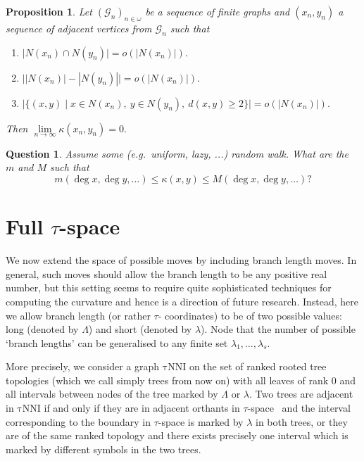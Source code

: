 \documentclass{amsart}
\newtheorem{question}{Question}
\newtheorem{proposition}{Proposition}
\newcommand{\tN}{\mathrm{\tau NNI}}
\begin{document}
\begin{proposition}
Let $(\mathcal G_n)_{n \in \omega}$ be a sequence of finite graphs and 
$(x_n, y_n)$ a sequence of adjacent vertices from $\mathcal G_n$ such that
\begin{enumerate}[(1)]
\item $\big|N(x_n) \cap N(y_n)\big| = o(|N(x_n)|).$ 
\item $\big||N(x_n)| - |N(y_n)|\big| = o(|N(x_n)|).$ 
\item $\big|\{(x,y) \mid x \in N(x_n),~ y \in N(y_n),~ d(x, y) \geq 2\}\big| = o(|N(x_n)|).$
\end{enumerate}

Then $\lim\limits_{n \to \infty} \kappa(x_n, y_n) = 0.$
\end{proposition}

\proof

\endproof

\begin{question}
Assume some (e.g.\ uniform, lazy, ...) random walk. What are the $m$ and $M$ 
such that 
\[
m(\deg x,\deg y, \ldots) \leq \kappa(x,y) \leq M(\deg x, \deg y, \ldots)? 
\]
\end{question}

\section{Full $\tau$-space}

We now extend the space of possible moves by including branch length moves. In general,
such moves should allow the branch length to be any positive real number, but this setting
seems to require quite sophisticated techniques for computing the curvature and hence is 
a direction of future research. Instead, here we allow branch length (or rather $\tau$-
coordinates) to be of two possible values: long (denoted by $\Lambda$) and short (denoted 
by $\lambda$). Node that the number of possible `branch lengths' can be generalised 
to any finite set $\lambda_1,\ldots,\lambda_s$.

More precisely, we consider a graph $\tN$ on the set of ranked rooted tree topologies 
(which we call simply trees from now on) with
all leaves of rank $0$ and all intervals between nodes of the tree marked by $\Lambda$ or
$\lambda$. Two trees are adjacent in $\tN$ if and only if they are in adjacent orthants in 
$\tau$-space~\cite{GD} and the interval corresponding to the boundary in $\tau$-space
is marked by $\lambda$ in both trees, or they are of the same ranked topology and there 
exists precisely one interval which is marked by different symbols in the two trees. 
\end{document}
